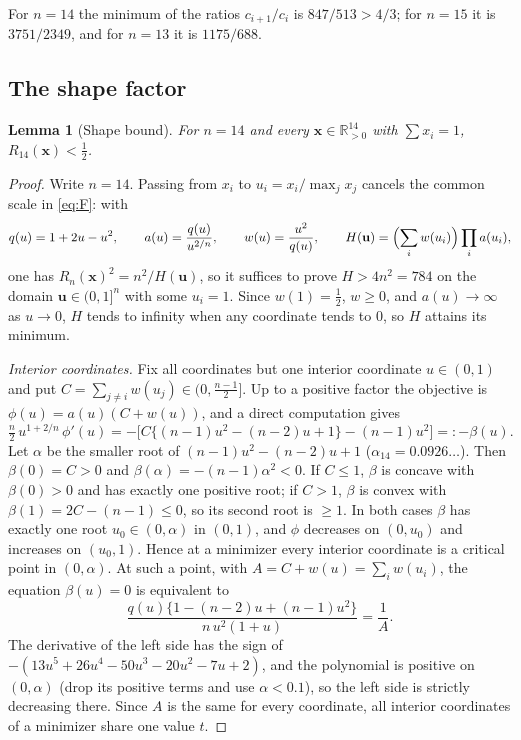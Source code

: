 \documentclass[11pt]{article}
\newtheorem{lemma}[theorem]{Lemma}
\theoremstyle{definition}
\theoremstyle{remark}
\newcommand{\R}{\mathbb{R}}
\newcommand{\vct}[1]{\mathbf{#1}}
\begin{document}
For $n=14$ the minimum of the ratios $c_{i+1}/c_i$ is
$847/513>4/3$; for $n=15$ it is $3751/2349$, and for $n=13$ it is
$1175/688$.

\subsection{The shape factor}

\begin{lemma}[Shape bound]\label{lem:shape}
For $n=14$ and every $\vct{x}\in\R_{>0}^{14}$ with $\sum x_i=1$,
$R_{14}(\vct{x})<\frac12$.
\end{lemma}

\begin{proof}
Write $n=14$.  Passing from $x_i$ to $u_i=x_i/\max_jx_j$ cancels the
common scale in \eqref{eq:F}: with
\[
  q(u)=1+2u-u^2,\qquad a(u)=\frac{q(u)}{u^{2/n}},\qquad
  w(u)=\frac{u^2}{q(u)},\qquad
  H(\vct{u})=\Bigl(\sum_iw(u_i)\Bigr)\prod_ia(u_i),
\]
one has $R_n(\vct{x})^2=n^2/H(\vct{u})$, so it suffices to prove
$H>4n^2=784$ on the domain $\vct{u}\in(0,1]^n$ with some $u_i=1$.  Since
$w(1)=\frac12$, $w\geq0$, and $a(u)\to\infty$ as $u\to0$, $H$ tends to
infinity when any coordinate tends to $0$, so $H$ attains its minimum.

\emph{Interior coordinates.}  Fix all coordinates but one interior
coordinate $u\in(0,1)$ and put $C=\sum_{j\neq i}w(u_j)\in(0,\frac{n-1}2]$.
Up to a positive factor the objective is $\phi(u)=a(u)(C+w(u))$, and a
direct computation gives
\begin{equation}\label{eq:phi}
  \tfrac n2\,u^{1+2/n}\,\phi'(u)
  =-\bigl[C\{(n-1)u^2-(n-2)u+1\}-(n-1)u^2\bigr]=:-\beta(u).
\end{equation}
Let $\alpha$ be the smaller root of $(n-1)u^2-(n-2)u+1$ ($\alpha_{14}
=0.0926\ldots$).  Then $\beta(0)=C>0$ and $\beta(\alpha)=-(n-1)\alpha^2<0$.
If $C\leq1$, $\beta$ is concave with $\beta(0)>0$ and has exactly one
positive root; if $C>1$, $\beta$ is convex with $\beta(1)=2C-(n-1)\leq0$,
so its second root is $\geq1$.  In both cases $\beta$ has exactly one
root $u_0\in(0,\alpha)$ in $(0,1)$, and $\phi$ decreases on $(0,u_0)$ and
increases on $(u_0,1)$.  Hence at a minimizer every interior coordinate is
a critical point in $(0,\alpha)$.  At such a point, with
$A=C+w(u)=\sum_iw(u_i)$, the equation $\beta(u)=0$ is equivalent to
\begin{equation}\label{eq:crit}
  \frac{q(u)\{1-(n-2)u+(n-1)u^2\}}{n\,u^2(1+u)}=\frac1A .
\end{equation}
The derivative of the left side has the sign of
$-(13u^5+26u^4-50u^3-20u^2-7u+2)$, and the polynomial is positive on
$(0,\alpha)$ (drop its positive terms and use $\alpha<0.1$), so the left
side is strictly decreasing there.  Since $A$ is the same for every
coordinate, all interior coordinates of a minimizer share one value $t$.


\end{proof}
\end{document}
